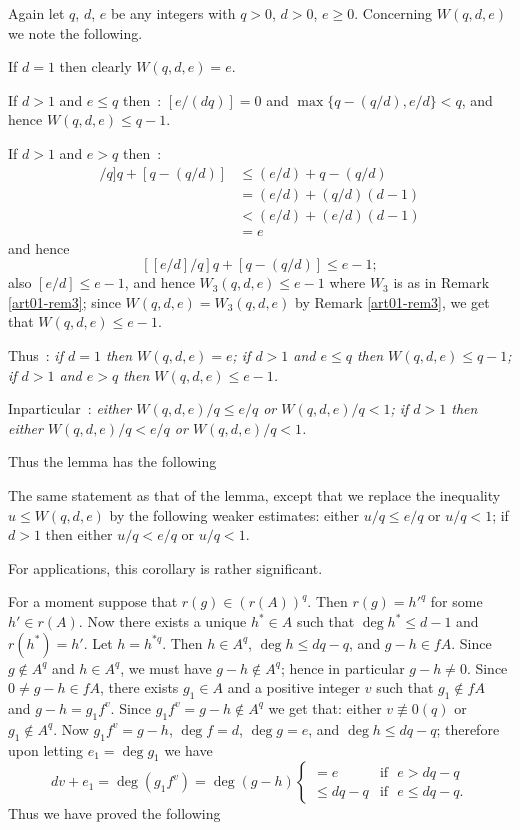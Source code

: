 \begin{remark}\label{art01-rem5}
Again let $q$, $d$, $e$ be any integers with $q>0$, $d>0$, $e\geq 0$. Concerning $W(q,d,e)$ we note the following.

If $d=1$ then clearly $W(q,d,e)=e$.

If $d>1$ and $e\leq q$ then~: $[e/(dq)]=0$ and $\max\{q-(q/d),e/d\}<q$, and hence $W(q,d,e)\leq q-1$.

If $d>1$ and $e>q$ then~:
\begin{align*}
[[e/d]/q]q+[q-(q/d)] &\leq (e/d)+q-(q/d)\\
                     &= (e/d)+(q/d)(d-1)\\
                     &< (e/d)+(e/d)(d-1)\\
                     &= e
\end{align*}
and hence
$$
[[e/d]/q]q+[q-(q/d)]\leq e-1;
$$
also $[e/d]\leq e-1$, and hence $W_{3}(q,d,e)\leq e-1$ where $W_{3}$ is as in Remark \ref{art01-rem3}; since $W(q,d,e)=W_{3}(q,d,e)$ by Remark \ref{art01-rem3}, we get that $W(q,d,e)\leq e-1$.

Thus~: {\em if $d=1$ then $W(q,d,e)=e$; if $d>1$ and $e\leq q$ then $W(q,d,e)\leq q-1$; if $d>1$ and $e>q$ then $W(q,d,e)\leq e-1$.}

In\pageoriginale particular~: {\em either $W(q,d,e)/q\leq e/q$ or $W(q,d,e)/q<1$; if $d>1$ then either $W(q,d,e)/q<e/q$ or $W(q,d,e)/q<1$.}
\end{remark}

Thus the lemma has the following

\begin{coro*}
The same statement as that of the lemma, except that we replace the inequality $u\leq W(q,d,e)$ by the following weaker estimates: either $u/q\leq e/q$ or $u/q<1$; if $d>1$ then either $u/q<e/q$ or $u/q<1$.
\end{coro*}

For applications, this corollary is rather significant.

\begin{remark}\label{art01-rem6}
For a moment suppose that $r(g)\in (r(A))^{q}$. Then $r(g)={h'}^{q}$ for some $h'\in r(A)$. Now there exists a unique $h^{*}\in A$ such that $\deg h^{*}\leq d-1$ and $r(h^{*})=h'$. Let $h=h^{*q}$. Then $h\in A^{q}$, $\deg h\leq dq-q$, and $g-h\in fA$. Since $g\not\in A^{q}$ and $h\in A^{q}$, we must have $g-h\not\in A^{q}$; hence in particular $g-h\neq 0$. Since $0\neq g-h\in fA$, there exists $g_{1}\in A$ and a positive integer $v$ such that $g_{1}\not\in fA$ and $g-h=g_{1}f^{v}$. Since $g_{1}f^{v}=g-h\not\in A^{q}$ we get that: either $v\nequiv 0(q)$ or $g_{1}\not\in A^{q}$. Now $g_{1}f^{v}=g-h$, $\deg f=d$, $\deg g=e$, and $\deg h\leq dq-q$; therefore upon letting $e_{1}=\deg g_{1}$ we have
$$
dv+e_{1}=\deg (g_{1}f^{v})=\deg(g-h)
\left\{
\begin{array}{ll}
=e & \text{if~ } e>dq-q\\
\leq dq-q & \text{if~ } e\leq dq-q.
\end{array}\right.
$$
Thus we have proved the following
\end{remark}

